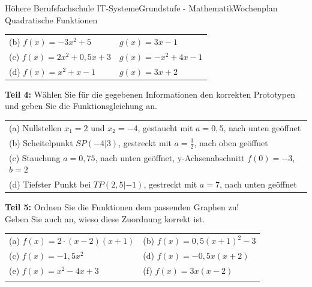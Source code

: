 \documentclass[oneside,openany,headings=optiontotoc,11pt,numbers=noenddot]{scrreprt}
\begin{document}
\begin{worksheet}{Höhere Berufsfachschule IT-Systeme}{Grundstufe - Mathematik}{Wochenplan Quadratische Funktionen}
\begin{framed}
\begin{tabularx}{\textwidth}{XX}
				(b) \(f(x) = -3x^2+5\) & \(g(x) = 3x-1\)\\
				(c) \(f(x) = 2x^2+0,5x+3\) & \(g(x) = -x^2+4x-1\)\\
				(d) \(f(x) = x^2+x-1\) & \(g(x) = 3x+2\)
			\end{tabularx}
		\end{framed}
		\begin{framed}
			\noindent
			\textbf{Teil 4:} Wählen Sie für die gegebenen Informationen den korrekten Prototypen und geben Sie die Funktionsgleichung an.\\
			\par\noindent
			\begin{tabularx}{\textwidth}{X}
				(a) Nullstellen \(x_1 = 2\) und \(x_2 = -4\), gestaucht mit \(a = 0,5\), nach unten geöffnet\\
				(b) Scheitelpunkt \(SP(-4|3)\), gestreckt mit \(a = \frac{3}{2}\), nach oben geöffnet\\
				(c) Stauchung \(a = 0,75\), nach unten geöffnet, y-Achsenabschnitt \(f(0) = -3\), \(b = 2\)\\
				(d) Tiefster Punkt bei \(TP(2,5|-1)\), gestreckt mit \(a = 7\), nach unten geöffnet
			\end{tabularx}
		\end{framed}
		\newpage
		\begin{framed}
			\noindent
			\textbf{Teil 5:} Ordnen Sie die Funktionen dem passenden Graphen zu!\\
			Geben Sie auch an, wieso diese Zuordnung korrekt ist.\\
			\par\noindent
			\begin{tabularx}{\textwidth}{XX}
				(a) \(f(x) = 2\cdot(x-2)(x+1)\) & (b) \(f(x) = 0,5(x+1)^2-3\)\\
				(c) \(f(x) = -1,5x^2\) & (d) \(f(x) = -0,5x(x+2)\)\\
				(e) \(f(x) = x^2 - 4x +3\) & (f) \(f(x) = 3x(x-2)\)\\
				\\

\end{tabularx}
\end{framed}
\end{worksheet}
\end{document}
